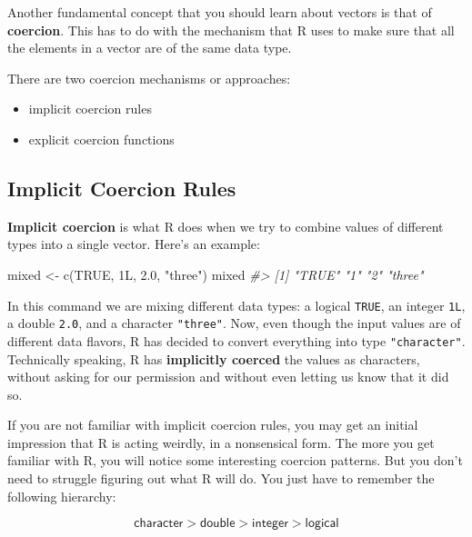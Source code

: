 \documentclass[
]{book}
\newenvironment{Shaded}{\begin{snugshade}}{\end{snugshade}}
\newcommand{\CommentTok}[1]{\textcolor[rgb]{0.56,0.35,0.01}{\textit{#1}}}
\newcommand{\ConstantTok}[1]{\textcolor[rgb]{0.00,0.00,0.00}{#1}}
\newcommand{\FloatTok}[1]{\textcolor[rgb]{0.00,0.00,0.81}{#1}}
\newcommand{\FunctionTok}[1]{\textcolor[rgb]{0.00,0.00,0.00}{#1}}
\newcommand{\NormalTok}[1]{#1}
\newcommand{\OtherTok}[1]{\textcolor[rgb]{0.56,0.35,0.01}{#1}}
\newcommand{\StringTok}[1]{\textcolor[rgb]{0.31,0.60,0.02}{#1}}
\begin{document}
Another fundamental concept that you should learn about vectors is that of
\textbf{coercion}. This has to do with the mechanism that R uses to make sure that
all the elements in a vector are of the same data type.

There are two coercion mechanisms or approaches:

\begin{itemize}
\item
  implicit coercion rules
\item
  explicit coercion functions
\end{itemize}

\hypertarget{implicit-coercion-rules}{%
\subsection{Implicit Coercion Rules}\label{implicit-coercion-rules}}

\textbf{Implicit coercion} is what R does when we try to combine values of different
types into a single vector. Here's an example:

\begin{Shaded}
\begin{Highlighting}[]
\NormalTok{mixed }\OtherTok{\textless{}{-}} \FunctionTok{c}\NormalTok{(}\ConstantTok{TRUE}\NormalTok{, 1L, }\FloatTok{2.0}\NormalTok{, }\StringTok{"three"}\NormalTok{)}
\NormalTok{mixed}
\CommentTok{\#\textgreater{} [1] "TRUE"  "1"     "2"     "three"}
\end{Highlighting}
\end{Shaded}

In this command we are mixing different data types: a logical \texttt{TRUE}, an integer
\texttt{1L}, a double \texttt{2.0}, and a character \texttt{"three"}. Now, even though the input
values are of different data flavors, R has decided to convert everything into
type \texttt{"character"}. Technically speaking, R has \textbf{implicitly coerced} the
values as characters, without asking for our permission and without even
letting us know that it did so.

If you are not familiar with implicit coercion rules, you may get an initial
impression that R is acting weirdly, in a nonsensical form. The more you get
familiar with R, you will notice some interesting coercion patterns. But you
don't need to struggle figuring out what R will do. You just have to remember
the following hierarchy:

\[
\mathsf{character > double > integer > logical}
\]
\end{document}
